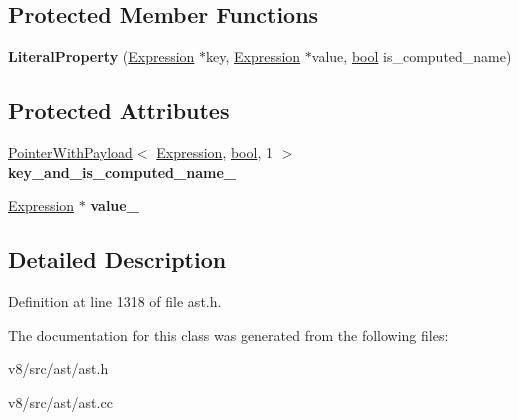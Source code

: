 \subsection*{Protected Member Functions}
\begin{DoxyCompactItemize}
\item 
\mbox{\label{classv8_1_1internal_1_1LiteralProperty_a100f2f76761baae0a633963797ecd78e}} 
{\bfseries Literal\+Property} (\mbox{\hyperlink{classv8_1_1internal_1_1Expression}{Expression}} $\ast$key, \mbox{\hyperlink{classv8_1_1internal_1_1Expression}{Expression}} $\ast$value, \mbox{\hyperlink{classbool}{bool}} is\+\_\+computed\+\_\+name)
\end{DoxyCompactItemize}
\subsection*{Protected Attributes}
\begin{DoxyCompactItemize}
\item 
\mbox{\label{classv8_1_1internal_1_1LiteralProperty_adce7e71a211f4b3b3419c5678132daf6}} 
\mbox{\hyperlink{classv8_1_1internal_1_1PointerWithPayload}{Pointer\+With\+Payload}}$<$ \mbox{\hyperlink{classv8_1_1internal_1_1Expression}{Expression}}, \mbox{\hyperlink{classbool}{bool}}, 1 $>$ {\bfseries key\+\_\+and\+\_\+is\+\_\+computed\+\_\+name\+\_\+}
\item 
\mbox{\label{classv8_1_1internal_1_1LiteralProperty_a29b056ba98a3e675a0a093999e115de6}} 
\mbox{\hyperlink{classv8_1_1internal_1_1Expression}{Expression}} $\ast$ {\bfseries value\+\_\+}
\end{DoxyCompactItemize}


\subsection{Detailed Description}


Definition at line 1318 of file ast.\+h.



The documentation for this class was generated from the following files\+:\begin{DoxyCompactItemize}
\item 
v8/src/ast/ast.\+h\item 
v8/src/ast/ast.\+cc\end{DoxyCompactItemize}
